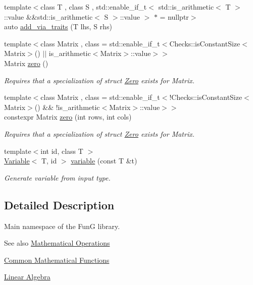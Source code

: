 \begin{DoxyCompactItemize}
\item 
{\footnotesize template$<$class T , class S , std\+::enable\+\_\+if\+\_\+t$<$ std\+::is\+\_\+arithmetic$<$ T $>$\+::value \&\&std\+::is\+\_\+arithmetic$<$ S $>$\+::value $>$ $\ast$  = nullptr$>$ }\\auto \hyperlink{namespaceFunG_a6cbaa3b1b61e5834b38db5c831e3c25e}{add\+\_\+via\+\_\+traits} (T lhs, S rhs)
\item 
{\footnotesize template$<$class Matrix , class  = std\+::enable\+\_\+if\+\_\+t$<$\+Checks\+::is\+Constant\+Size$<$\+Matrix$>$() $\vert$$\vert$ is\+\_\+arithmetic$<$\+Matrix$>$\+::value$>$$>$ }\\Matrix \hyperlink{namespaceFunG_a649b4470d6def401959bfea3a368c48c}{zero} ()
\begin{DoxyCompactList}\small\item\em Requires that a specialization of struct \hyperlink{structFunG_1_1Zero}{Zero} exists for Matrix. \end{DoxyCompactList}\item 
{\footnotesize template$<$class Matrix , class  = std\+::enable\+\_\+if\+\_\+t$<$!\+Checks\+::is\+Constant\+Size$<$\+Matrix$>$() \&\& !is\+\_\+arithmetic$<$\+Matrix$>$\+::value$>$$>$ }\\constexpr Matrix \hyperlink{namespaceFunG_ae633433339ba30207aa526e54e3924b4}{zero} (int rows, int cols)
\begin{DoxyCompactList}\small\item\em Requires that a specialization of struct \hyperlink{structFunG_1_1Zero}{Zero} exists for Matrix. \end{DoxyCompactList}\item 
{\footnotesize template$<$int id, class T $>$ }\\\hyperlink{structFunG_1_1Variable}{Variable}$<$ T, id $>$ \hyperlink{namespaceFunG_a2ead025b35a8cdf3ac8c170524ab61c0}{variable} (const T \&t)
\begin{DoxyCompactList}\small\item\em Generate variable from input type. \end{DoxyCompactList}\end{DoxyCompactItemize}


\subsection{Detailed Description}
Main namespace of the FunG library. 

\begin{DoxySeeAlso}{See also}
\hyperlink{group__MathematicalOperationsGroup}{Mathematical Operations} 

\hyperlink{group__CMathGroup}{Common Mathematical Functions} 

\hyperlink{group__LinearAlgebraGroup}{Linear Algebra} 
\end{DoxySeeAlso}


